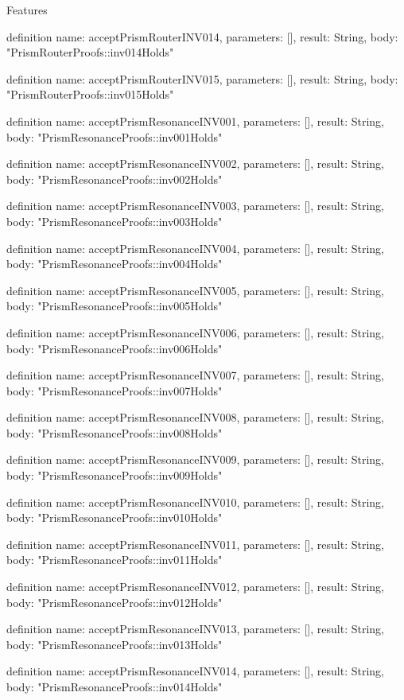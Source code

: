 \begin{lexlean}{Features}
\begin{semanticmodule}
definition{
  name: acceptPrismRouterINV014,
  parameters: [],
  result: String,
  body: "PrismRouterProofs::inv014Holds"
}

definition{
  name: acceptPrismRouterINV015,
  parameters: [],
  result: String,
  body: "PrismRouterProofs::inv015Holds"
}

definition{
  name: acceptPrismResonanceINV001,
  parameters: [],
  result: String,
  body: "PrismResonanceProofs::inv001Holds"
}

definition{
  name: acceptPrismResonanceINV002,
  parameters: [],
  result: String,
  body: "PrismResonanceProofs::inv002Holds"
}

definition{
  name: acceptPrismResonanceINV003,
  parameters: [],
  result: String,
  body: "PrismResonanceProofs::inv003Holds"
}

definition{
  name: acceptPrismResonanceINV004,
  parameters: [],
  result: String,
  body: "PrismResonanceProofs::inv004Holds"
}

definition{
  name: acceptPrismResonanceINV005,
  parameters: [],
  result: String,
  body: "PrismResonanceProofs::inv005Holds"
}

definition{
  name: acceptPrismResonanceINV006,
  parameters: [],
  result: String,
  body: "PrismResonanceProofs::inv006Holds"
}

definition{
  name: acceptPrismResonanceINV007,
  parameters: [],
  result: String,
  body: "PrismResonanceProofs::inv007Holds"
}

definition{
  name: acceptPrismResonanceINV008,
  parameters: [],
  result: String,
  body: "PrismResonanceProofs::inv008Holds"
}

definition{
  name: acceptPrismResonanceINV009,
  parameters: [],
  result: String,
  body: "PrismResonanceProofs::inv009Holds"
}

definition{
  name: acceptPrismResonanceINV010,
  parameters: [],
  result: String,
  body: "PrismResonanceProofs::inv010Holds"
}

definition{
  name: acceptPrismResonanceINV011,
  parameters: [],
  result: String,
  body: "PrismResonanceProofs::inv011Holds"
}

definition{
  name: acceptPrismResonanceINV012,
  parameters: [],
  result: String,
  body: "PrismResonanceProofs::inv012Holds"
}

definition{
  name: acceptPrismResonanceINV013,
  parameters: [],
  result: String,
  body: "PrismResonanceProofs::inv013Holds"
}

definition{
  name: acceptPrismResonanceINV014,
  parameters: [],
  result: String,
  body: "PrismResonanceProofs::inv014Holds"
}


\end{semanticmodule}
\end{lexlean}
